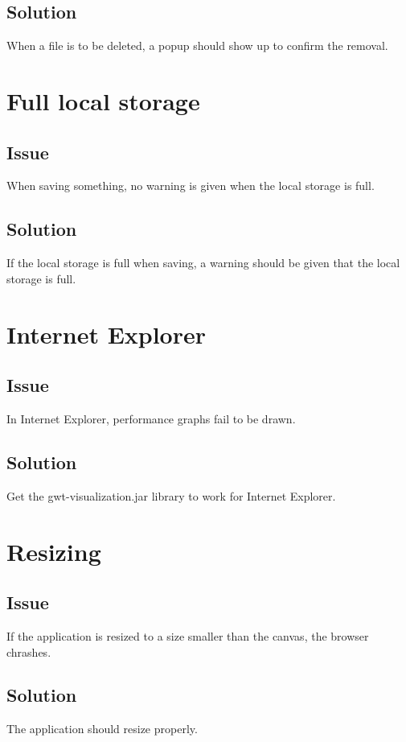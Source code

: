 \subsection*{Solution}
When a file is to be deleted, a popup should show up to confirm the removal.

\section{Full local storage}

\subsection*{Issue}
When saving something, no warning is given when the local storage is full.

\subsection*{Solution}
If the local storage is full when saving, a warning should be given that the local storage is full.

\section{Internet Explorer}

\subsection*{Issue}
In Internet Explorer, performance graphs fail to be drawn.

\subsection*{Solution}
Get the gwt-visualization.jar library to work for Internet Explorer.

\section{Resizing}

\subsection*{Issue}
If the application is resized to a size smaller than the canvas, the browser chrashes.

\subsection*{Solution}
The application should resize properly.

